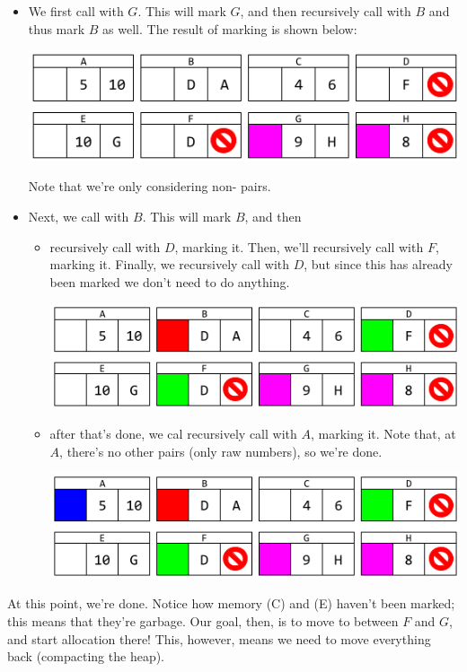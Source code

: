 \documentclass[letterpaper]{article}
\begin{document}
\begin{itemize}
    \item We first call  with $G$. This will mark $G$, and then recursively call  with $B$ and thus mark $B$ as well. The result of marking is shown below: 
    \begin{center}
        \includegraphics[scale=0.6]{../assets/GCAlg2_1.png}
    \end{center}
    Note that we're only considering non- pairs.

    \item Next, we call  with $B$. This will mark $B$, and then  
    \begin{itemize}
        \item recursively call  with $D$, marking it. Then, we'll recursively call  with $F$, marking it. Finally, we recursively call  with $D$, but since this has already been marked we don't need to do anything.
        
        \begin{center}
            \includegraphics[scale=0.6]{../assets/GCAlg2_2.png}
        \end{center}

        \item after that's done, we cal recursively call  with $A$, marking it. Note that, at $A$, there's no other pairs (only raw numbers), so we're done. 
        
        \begin{center}
            \includegraphics[scale=0.6]{../assets/GCAlg2_3.png}
        \end{center}
    \end{itemize}
\end{itemize}
At this point, we're done. Notice how memory (C) and (E) haven't been marked; this means that they're garbage. Our goal, then, is to move  to between $F$ and $G$, and start allocation there! This, however, means we need to move everything back (compacting the heap).
\end{document}
